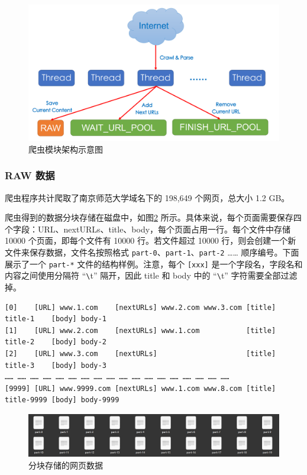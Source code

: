 \documentclass{ctexart}
\newcommand{\code}[1]{\colorbox{backcolor}{\lstinline|#1|}}
\begin{document}
    \begin{figure}[t]
        \centering
        \includegraphics[width=\textwidth]{src/crawl}
        \caption{爬虫模块架构示意图}
        \label{fig:crawl}
    \end{figure}

    \subsubsection{RAW 数据}\label{subsubsec:crawl_data}

    爬虫程序共计爬取了南京师范大学域名下的 198,649 个网页，总大小 1.2 GB。

    爬虫得到的数据分块存储在磁盘中，如图\ref{fig:crawl_files} 所示。具体来说，每个页面需要保存四个字段：URL、nextURLs、title、body，每个页面占用一行。每个文件中存储 10000 个页面，即每个文件有 10000 行。若文件超过 10000 行，则会创建一个新文件来保存数据，文件名按照格式 \code{part-0}、\code{part-1}、\code{part-2} …… 顺序编号。下面展示了一个 \code{part-*} 文件的结构样例。注意，每个 \code{[xxx]} 是一个字段名，字段名和内容之间使用分隔符 “\verb|\|t” 隔开，因此 title 和 body 中的 “\verb|\|t” 字符需要全部过滤掉。

    \begin{lstlisting}[basicstyle=\ttfamily\footnotesize]
[0]    [URL] www.1.com    [nextURLs] www.2.com www.3.com [title] title-1    [body] body-1
[1]    [URL] www.2.com    [nextURLs] www.1.com           [title] title-2    [body] body-2
[2]    [URL] www.3.com    [nextURLs]                     [title] title-3    [body] body-3
…… …… …… …… …… …… …… …… …… …… …… …… …… …… …… …… …… ……
[9999] [URL] www.9999.com [nextURLs] www.1.com www.8.com [title] title-9999 [body] body-9999
    \end{lstlisting}

    \begin{figure}[h]
        \centering
        \includegraphics[width=\textwidth]{src/crawl_files}
        \caption{分块存储的网页数据}
        \label{fig:crawl_files}
    \end{figure}
\end{document}
